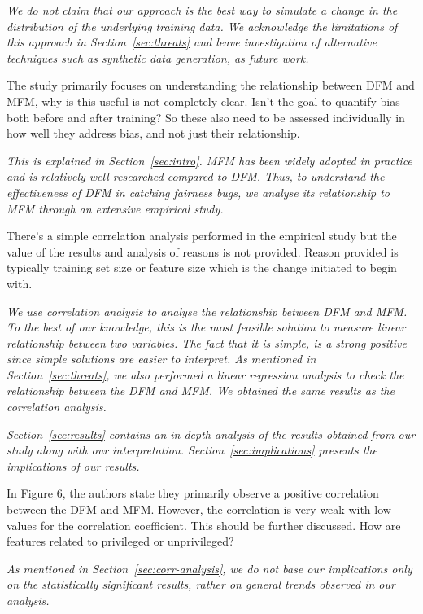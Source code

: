 \documentclass[conference,review,anonymous]{IEEEtran}
\newcommand{\highlight}[1]{\begin{framed}%
  \noindent\emph{#1}
\end{framed}}
\begin{document}
\highlight{We do not claim that our approach is the best way to
simulate a change in the distribution of the underlying training
data. We acknowledge the limitations of this approach in
Section~\ref{sec:threats} and leave investigation of alternative
techniques such as synthetic data generation, as future work.}

The study primarily focuses on understanding the relationship between
DFM and MFM, why is this useful is not completely clear. Isn't the
goal to quantify bias both before and after training? So these also
need to be assessed individually in how well they address bias, and
not just their relationship. 

\highlight{This is explained in Section~\ref{sec:intro}. MFM has been
widely adopted in practice and is relatively well researched compared
to DFM. Thus, to understand the effectiveness of DFM in catching
fairness bugs, we analyse its relationship to MFM through an extensive
empirical study.}

There's a simple correlation analysis performed in the empirical study
but the value of the results and analysis of reasons is not
provided. Reason provided is typically training set size or feature
size which is the change initiated to begin with.

\highlight{We use correlation analysis to analyse the relationship
between DFM and MFM. To the best of our knowledge, this is the most
feasible solution to measure linear relationship between two
variables. The fact that it is simple, is a strong positive since
simple solutions are easier to interpret. As mentioned in
Section~\ref{sec:threats}, we also performed a linear regression
analysis to check the relationship between the DFM and MFM. We
obtained the same results as the correlation analysis.}

\highlight{Section~\ref{sec:results} contains an in-depth analysis of
the results obtained from our study along with our
interpretation. Section~\ref{sec:implications} presents the
implications of our results.}

In Figure 6, the authors state they primarily observe a positive
correlation between the DFM and MFM. However, the correlation is very
weak with low values for the correlation coefficient. This should be
further discussed. How are features related to privileged or
unprivileged?

\highlight{As mentioned in Section~\ref{sec:corr-analysis}, we do not
base our implications only on the statistically significant results,
rather on general trends observed in our analysis.}
\end{document}
